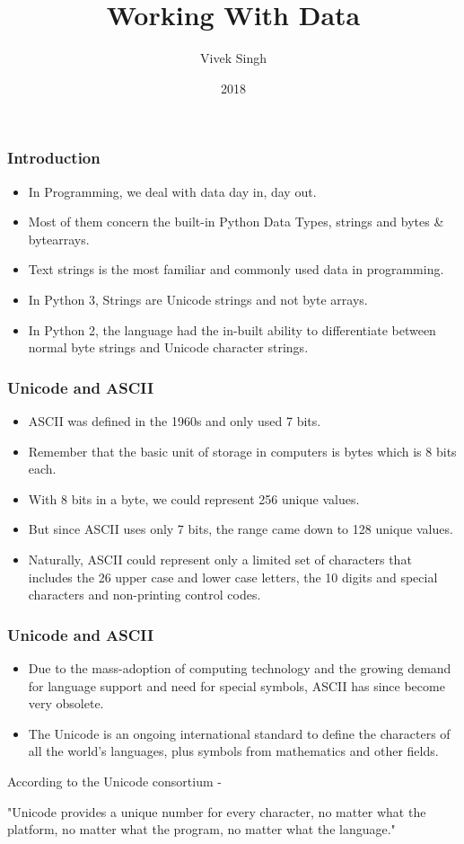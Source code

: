 \documentclass{beamer}
\title{Working With Data}
\author{Vivek Singh}
\institute{Information Systems Decision Sciences (ISDS)\\
MUMA College of Business\\
University of South Florida \\
Tampa, Florida}
\date{2018}
\begin{document}
 
\frame{\titlepage}

\begin{frame}
\frametitle{Introduction}
\begin{itemize}
\item In Programming, we deal with data day in, day out.
\item Most of them concern the built-in Python Data Types, strings and bytes \& bytearrays.
\item Text strings is the most familiar and commonly used data in programming.
\item In Python 3, Strings are Unicode strings and not byte arrays. 
\item In Python 2, the language had the in-built ability to differentiate between normal byte strings and Unicode character strings.

\end{itemize}
\end{frame} 

\begin{frame}
\frametitle{Unicode and ASCII}
\begin{itemize}
\item ASCII was defined in the 1960s and only used 7 bits.
\item Remember that the basic unit of storage in computers is bytes which is 8 bits each.
\item With 8 bits in a byte, we could represent 256 unique values.
\item But since ASCII uses only 7 bits, the range came down to 128 unique values.
\item Naturally, ASCII could represent only a limited set of characters that includes the 26 upper case and lower case letters, the 10 digits and special characters and non-printing control codes.
\end{itemize}
\end{frame}

\begin{frame}
\frametitle{Unicode and ASCII}
\begin{itemize}
\item Due to the mass-adoption of computing technology and the growing demand for language support and need for special symbols, ASCII has since become very obsolete.
\item The Unicode is an ongoing international standard to define the characters of all the world’s languages, plus symbols from mathematics and other fields.
\end{itemize}
According to the Unicode consortium -

"Unicode provides a unique number for every character, no matter what the platform, no
matter what the program, no matter what the language."
\end{frame}
\end{document}
